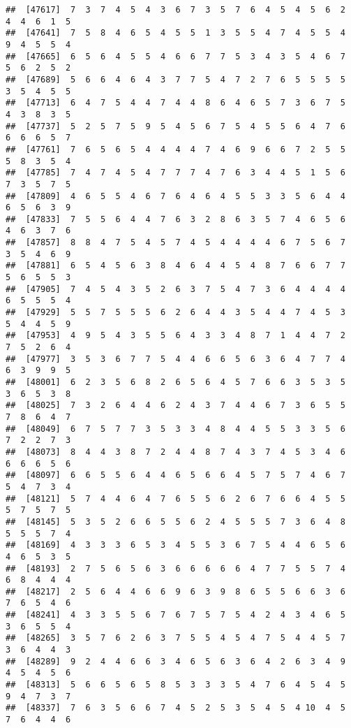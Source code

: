 \documentclass[
]{book}
\begin{document}
\begin{verbatim}
##  [47617]  7  3  7  4  5  4  3  6  7  3  5  7  6  4  5  4  5  6  2  4  4  6  1  5
##  [47641]  7  5  8  4  6  5  4  5  5  1  3  5  5  4  7  4  5  5  4  9  4  5  5  4
##  [47665]  6  5  6  4  5  5  4  6  6  7  7  5  3  4  3  5  4  6  7  5  6  2  5  2
##  [47689]  5  6  6  4  6  4  3  7  7  5  4  7  2  7  6  5  5  5  5  3  5  4  5  5
##  [47713]  6  4  7  5  4  4  7  4  4  8  6  4  6  5  7  3  6  7  5  4  3  8  3  5
##  [47737]  5  2  5  7  5  9  5  4  5  6  7  5  4  5  5  6  4  7  6  6  6  6  5  7
##  [47761]  7  6  5  6  5  4  4  4  4  7  4  6  9  6  6  7  2  5  5  5  8  3  5  4
##  [47785]  7  4  7  4  5  4  7  7  7  4  7  6  3  4  4  5  1  5  6  7  3  5  7  5
##  [47809]  4  6  5  5  4  6  7  6  4  6  4  5  5  3  3  5  6  4  4  6  5  6  3  9
##  [47833]  7  5  5  6  4  4  7  6  3  2  8  6  3  5  7  4  6  5  6  4  6  3  7  6
##  [47857]  8  8  4  7  5  4  5  7  4  5  4  4  4  4  6  7  5  6  7  3  5  4  6  9
##  [47881]  6  5  4  5  6  3  8  4  6  4  4  5  4  8  7  6  6  7  7  5  6  5  5  3
##  [47905]  7  4  5  4  3  5  2  6  3  7  5  4  7  3  6  4  4  4  4  6  5  5  5  4
##  [47929]  5  5  7  5  5  5  6  2  6  4  4  3  5  4  4  7  4  5  3  5  4  4  5  9
##  [47953]  4  9  5  4  3  5  5  6  4  3  3  4  8  7  1  4  4  7  2  7  5  2  6  4
##  [47977]  3  5  3  6  7  7  5  4  4  6  6  5  6  3  6  4  7  7  4  6  3  9  9  5
##  [48001]  6  2  3  5  6  8  2  6  5  6  4  5  7  6  6  3  5  3  5  3  6  5  3  8
##  [48025]  7  3  2  6  4  4  6  2  4  3  7  4  4  6  7  3  6  5  5  7  8  6  4  7
##  [48049]  6  7  5  7  7  3  5  3  3  4  8  4  4  5  5  3  3  5  6  7  2  2  7  3
##  [48073]  8  4  4  3  8  7  2  4  4  8  7  4  3  7  4  5  3  4  6  6  6  6  5  6
##  [48097]  6  6  5  5  6  4  4  6  5  6  6  4  5  7  5  7  4  6  7  5  4  7  3  4
##  [48121]  5  7  4  4  6  4  7  6  5  5  6  2  6  7  6  6  4  5  5  5  7  5  7  5
##  [48145]  5  3  5  2  6  6  5  5  6  2  4  5  5  5  7  3  6  4  8  5  5  5  7  4
##  [48169]  4  3  3  3  6  5  3  4  5  5  3  6  7  5  4  4  6  5  6  4  6  5  3  5
##  [48193]  2  7  5  6  5  6  3  6  6  6  6  6  4  7  7  5  5  7  4  6  8  4  4  4
##  [48217]  2  5  6  4  4  6  6  9  6  3  9  8  6  5  5  6  6  3  6  7  6  5  4  6
##  [48241]  4  3  3  5  5  6  7  6  7  5  7  5  4  2  4  3  4  6  5  3  6  5  5  4
##  [48265]  3  5  7  6  2  6  3  7  5  5  4  5  4  7  5  4  4  5  7  3  6  4  4  3
##  [48289]  9  2  4  4  6  6  3  4  6  5  6  3  6  4  2  6  3  4  9  4  5  4  5  6
##  [48313]  5  6  6  5  6  5  8  5  3  3  3  5  4  7  6  4  5  4  5  9  4  7  3  7
##  [48337]  7  6  3  5  6  6  7  4  5  2  5  3  5  4  5  4 10  4  5  7  6  4  4  6

\end{verbatim}
\end{document}
